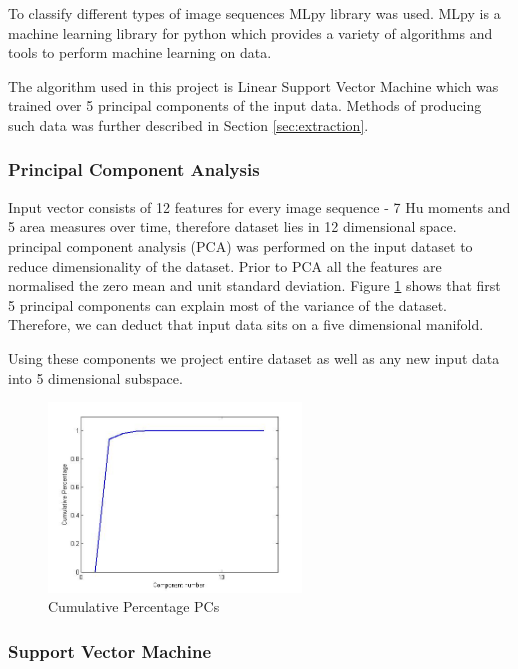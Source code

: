 To classify different types of image sequences MLpy library was used. MLpy is a machine learning library for python which provides a variety of algorithms and tools to perform machine learning on data.

The algorithm used in this project is Linear Support Vector Machine which was trained over 5 principal components of the input data. Methods of producing such data was further described in Section \ref{sec:extraction}.

\subsubsection*{Principal Component Analysis}

Input vector consists of 12 features for every image sequence - 7 Hu moments and 5 area measures over time, therefore dataset lies in 12 dimensional space. principal component analysis (PCA) was performed on the input dataset to reduce dimensionality of the dataset. Prior to PCA all the features are normalised the zero mean and unit standard deviation. Figure \ref{fig:pcaplot} shows that first 5 principal components can explain most of the variance of the dataset. Therefore, we can deduct that input data sits on a five dimensional manifold. 

Using these components we project entire dataset as well as any new input data into 5 dimensional subspace.

\begin{figure}[htp]
\begin{center}
\leavevmode
\includegraphics[width=0.6\textwidth] {pca.jpg}
\end{center}
\caption{Cumulative Percentage PCs}
\label{fig:pcaplot}
\end{figure}

\subsubsection*{Support Vector Machine}

